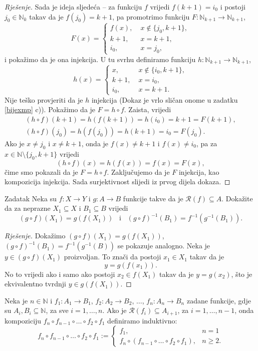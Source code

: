 \begin{proof}[Rješenje]
Sada je ideja sljedeća -- za funkciju \(f\) vrijedi \(f(k+1)=i_0\) i postoji \(j_0\in \mathbb{N}_k\) takav da je \(f(j_0)=k+1\), pa promotrimo funkciju \(F : \mathbb{N}_{k+1}\to \mathbb{N}_{k+1}\),
\[F(x)=\begin{cases}
f(x), &\;x\notin\{j_0, k+1\},\\
k+1, &\; x=k+1,\\
i_0, &\; x=j_0,
\end{cases}\]
i pokažimo da je ona injekcija. U tu svrhu definiramo funkciju \(h : \mathbb{N}_{k+1}\to \mathbb{N}_{k+1}\),
\[h(x)=\begin{cases}
x, &\;x\notin\{i_0, k+1\},\\
k+1, &\; x=i_0,\\
i_0, &\; x=k+1.
\end{cases}\]
Nije teško provjeriti da je \(h\) injekcija (Dokaz je vrlo sličan onome u zadatku \ref{bijexmp} c)). Pokažimo da je \(F=h\circ f\). Zaista, vrijedi 
\begin{gather*}
(h\circ f)(k+1)=h\left(f(k+1)\right)=h(i_0)=k+1=F(k+1),\\
(h\circ f)(j_0)=h\left(f(j_0)\right)=h(k+1)=i_0=F(j_0).
\end{gather*}
Ako je \(x\neq j_0\) i \(x\neq k+1\), onda je \(f(x)\neq k+1\) i \(f(x)\neq i_0\), pa za \(x\in \mathbb{N}\setminus\{j_0, k+1\}\) vrijedi \[(h\circ f)(x)=h\left(f(x)\right)=f(x)=F(x),\]
čime smo pokazali da je \(F=h\circ f\). Zaključujemo da je \(F\) injekcija, kao kompozicija injekcija. Sada surjektivnost slijedi iz prvog dijela dokaza.
\end{proof}
\begin{exercise}{Zadatak}
\label{compim}
Neka su \(f : X\to Y\) i \(g : A\to B\) funkcije takve da je \(\mathcal{R}(f)\subseteq A\). Dokažite da za neprazne \(X_1\subseteq X\) i \(B_1\subseteq B\) vrijedi \[(g\circ f)(X_1)=g(f(X_1))\;\;\;\text{i}\;\;\;(g\circ f)^{-1}(B_1)=f^{-1}(g^{-1}(B_1)).\]
\end{exercise}
\begin{proof}[Rješenje]
Dokažimo \((g\circ f)(X_1)=g(f(X_1))\), \((g\circ f)^{-1}(B_1)=f^{-1}(g^{-1}(B))\) se pokazuje analogno. Neka je \(y\in (g\circ f)(X_1)\) proizvoljan. To znači da postoji \(x_1\in X_1\) takav da je \[y=g\left(f(x_1)\right).\]
No to vrijedi ako i samo ako postoji \(x_2\in f(X_1)\) takav da je \(y=g(x_2)\), što je ekvivalentno tvrdnji \(y\in g(f(X_1))\).
\end{proof}
\begin{definition}
\label{ncomp}
Neka je \(n\in \mathbb{N}\) i \(f_1 : A_1\to B_1\), \(f_2 : A_2\to B_2\), \(\dots\), \(f_n : A_n\to B_n\) zadane funkcije, gdje su \(A_i, B_i\subseteq \mathbb{N}\), za sve \(i=1,\dots, n\). Ako je \(\mathcal{R}(f_i)\subseteq A_{i+1}\), za \(i=1,\dots, n-1\), onda kompoziciju \(f_n\circ f_{n-1}\circ \dots \circ f_2\circ f_1\) definiramo induktivno:
\[f_n\circ f_{n-1}\circ \dots \circ f_2\circ f_1:=\begin{cases}
f_1, & n=1\\
f_n\circ (f_{n-1}\circ \dots \circ f_2\circ f_1),& n\geq 2.
\end{cases}
\]
\end{definition}
